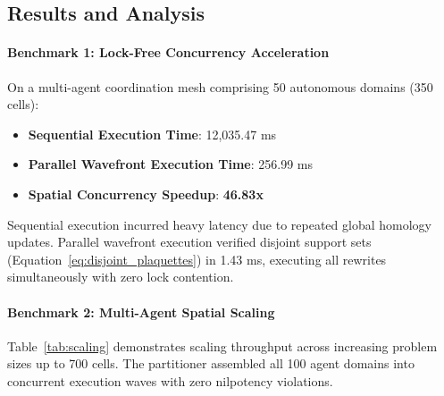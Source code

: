 \documentclass[conference]{IEEEtran}
\begin{document}
\subsection{Results and Analysis}

\paragraph{Benchmark 1: Lock-Free Concurrency Acceleration}
On a multi-agent coordination mesh comprising 50 autonomous domains (350 cells):
\begin{itemize}
    \item \textbf{Sequential Execution Time}: 12,035.47 ms
    \item \textbf{Parallel Wavefront Execution Time}: 256.99 ms
    \item \textbf{Spatial Concurrency Speedup}: \textbf{46.83x}
\end{itemize}
Sequential execution incurred heavy latency due to repeated global homology updates. Parallel wavefront execution verified disjoint support sets (Equation~\eqref{eq:disjoint_plaquettes}) in 1.43 ms, executing all rewrites simultaneously with zero lock contention.

\paragraph{Benchmark 2: Multi-Agent Spatial Scaling}
Table~\ref{tab:scaling} demonstrates scaling throughput across increasing problem sizes up to 700 cells. The partitioner assembled all 100 agent domains into concurrent execution waves with zero nilpotency violations.

\begin{table}[htbp]
\centering
\caption{Multi-Agent Spatial Mesh Scaling Benchmark}
\label{tab:scaling}
\vspace{0.3em}
\end{table}
\end{document}
